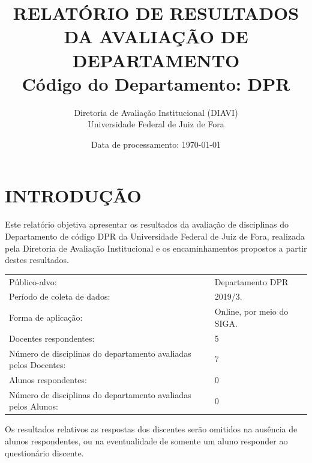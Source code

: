 \documentclass[a4paper,10pt]{article}
\date{Data de processamento: \today}
\begin{document}
\author{Diretoria de Avaliação Institucional (DIAVI) \\ Universidade Federal de Juiz de Fora}

\title{RELATÓRIO DE RESULTADOS DA AVALIAÇÃO DE DEPARTAMENTO\\ Código do Departamento: DPR}
\maketitle
\section{INTRODUÇÃO}
Este relatório objetiva apresentar os resultados da avaliação de disciplinas do Departamento     de código DPR da Universidade Federal de Juiz de Fora, realizada pela     Diretoria de Avaliação Institucional e os encaminhamentos propostos a     partir destes resultados.

\begin{center}
\begin{tabularx}{\linewidth}{X|l}

Público-alvo:& Departamento  DPR\\

Período de coleta de dados:& 2019/3.\\

Forma de aplicação:& Online, por meio do SIGA.\\

Docentes respondentes:& 5\\

Número de disciplinas do departamento avaliadas pelos Docentes:& 7\\

Alunos   respondentes:& 0\\

Número de disciplinas do departamento  avaliadas pelos   Alunos:& 0\\
\end{tabularx}
\end{center}

Os resultados relativos as respostas dos discentes serão omitidos na ausência de alunos respondentes, ou na eventualidade de somente um aluno responder ao questionário discente.
\end{document}
